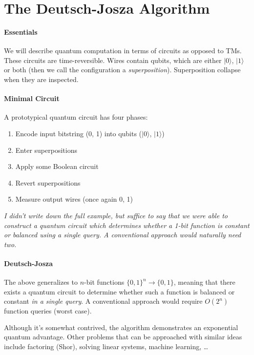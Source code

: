 \documentclass{article}
\begin{document}
\section*{The Deutsch-Josza Algorithm}

\paragraph{Essentials} We will describe quantum computation in terms of circuits as opposed to TMs. These circuits are time-reversible. Wires contain qubits, which are either $|0\rangle$, $|1\rangle$ or both (then we call the configuration a \emph{superposition}). Superposition collapse when they are inspected.

\paragraph{Minimal Circuit} A prototypical quantum circuit has four phases:

\begin{enumerate}[label=\arabic*.]
    \item Encode input bitstring (0, 1) into qubits ($|0\rangle$, $|1\rangle$)
    \item Enter superpositions
    \item Apply some Boolean circuit
    \item Revert superpositions
    \item Measure output wires (once again 0, 1)
\end{enumerate}

\emph{I didn't write down the full example, but suffice to say that we were able to construct a quantum circuit which determines whether a 1-bit function is constant or balanced using a single query. A conventional approach would naturally need two.}

\paragraph{Deutsch-Josza} The above generalizes to $n$-bit functions $\{0, 1\}^n \to \{0, 1\}$, meaning that there exists a quantum circuit to determine whether such a function is balanced or constant \emph{in a single query}. A conventional approach would require $O(2^n)$ function queries (worst case).

Although it's somewhat contrived, the algorithm demonstrates an exponential quantum advantage. Other problems that can be approached with similar ideas include factoring (Shor), solving linear systems, machine learning, \ldots
\end{document}
